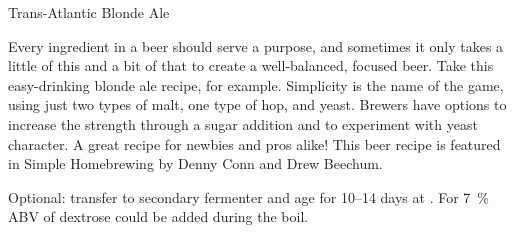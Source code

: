 \stylesection{\styleblondale}

\begin{recipie}{Trans-Atlantic Blonde Ale}

\begin{aboutblock}
Every ingredient in a beer should serve a purpose, and sometimes it only takes a
little of this and a bit of that to create a well-balanced, focused beer. Take
this easy-drinking blonde ale recipe, for example. Simplicity is the name of the
game, using just two types of malt, one type of hop, and yeast. Brewers have
options to increase the strength through a sugar addition and to experiment with
yeast character. A great recipe for newbies and pros alike! This beer recipe is
featured in Simple Homebrewing by Denny Conn and Drew Beechum. \sourceaha
\end{aboutblock}


\begin{methodandtiming}
 
\begin{mashsteps}
\end{mashsteps}

\begin{fermentationsteps}
\end{fermentationsteps}

\begin{directions}
Optional: transfer to secondary fermenter and age for 10--14 days at
. For 7~\% ABV  of dextrose could be added during
the boil.
\end{directions}

\end{methodandtiming}

\pagebreak

\begin{ingredientsblock}

\begin{malts}
\end{malts}

\begin{hops}
\end{hops}


\end{ingredientsblock}

\end{recipie}
